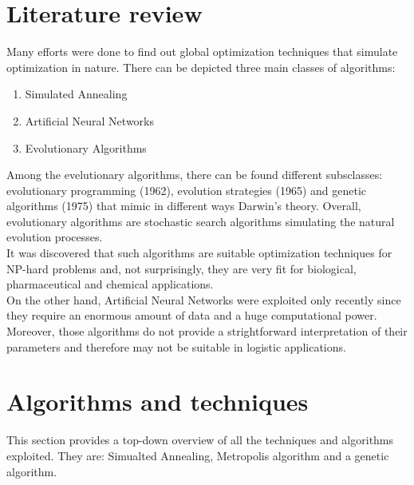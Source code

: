 \documentclass{article}
\begin{document}
\section{Literature review}
Many efforts were done to find out global optimization techniques that simulate optimization in nature. There can be depicted three main classes of algorithms:
\begin{enumerate}
\item Simulated Annealing
\item Artificial Neural Networks
\item Evolutionary Algorithms
\end{enumerate}
Among the evelutionary algorithms, there can be found different subsclasses: evolutionary programming (1962), evolution strategies (1965) and genetic algorithms (1975) that mimic in different ways Darwin's theory.  Overall, evolutionary algorithms are stochastic search algorithms simulating the natural evolution processes. \cite{gareview}\\
It was discovered that such algorithms are suitable optimization techniques for NP-hard problems and, not surprisingly, they are very fit for biological, pharmaceutical and chemical applications. \\
On the other hand, Artificial Neural Networks were exploited only recently since they require an enormous amount of data and a huge computational power. \cite{annreview} \\
Moreover, those algorithms do not provide a strightforward interpretation of their parameters and therefore may not be suitable in logistic applications.

\section{Algorithms and techniques} \label{algorithms}
This section provides a top-down overview of all the techniques and algorithms exploited. They are: Simualted Annealing, Metropolis algorithm and a genetic algorithm.
\end{document}
